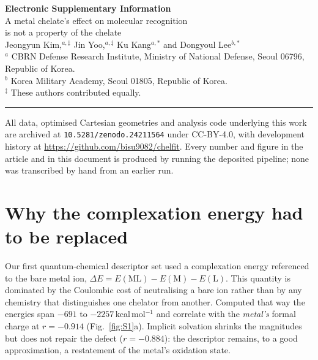 \documentclass[11pt,a4paper]{article}
\begin{document}
\begin{center}
{\Large\bfseries Electronic Supplementary Information}\\[8pt]
{\large A metal chelate's effect on molecular recognition\\is not a property of the chelate}\\[10pt]
{Jeongyun Kim,$^{a,\ddag}$ Jin Yoo,$^{a,\ddag}$ Ku Kang$^{a,\ast}$ and Dongyoul Lee$^{b,\ast}$}\\[6pt]
{\footnotesize $^{a}$ CBRN Defense Research Institute, Ministry of National Defense, Seoul 06796, Republic of Korea.\\
$^{b}$ Korea Military Academy, Seoul 01805, Republic of Korea.\\
$^{\ddag}$ These authors contributed equally.}
\end{center}

\vspace{6pt}
\hrule
\vspace{10pt}

\noindent
All data, optimised Cartesian geometries and analysis code underlying this work are archived at
\mbox{\texttt{10.5281/zenodo.24211564}} under CC-BY-4.0, with development history at
\url{https://github.com/bisu9082/chelfit}. Every number and figure in the article and in this
document is produced by running the deposited pipeline; none was transcribed by hand from an
earlier run.

\tableofcontents

\section{Why the complexation energy had to be replaced}

Our first quantum-chemical descriptor set used a complexation energy referenced to the bare metal
ion, $\Delta E = E(\mathrm{ML}) - E(\mathrm{M}) - E(\mathrm{L})$. This quantity is dominated by the
Coulombic cost of neutralising a bare  ion rather than by any chemistry that
distinguishes one chelator from another. Computed that way the energies span
$-691$ to $-2257$\,kcal\,mol$^{-1}$ and correlate with the \emph{metal's} formal charge at
$r = -0.914$ (Fig.~\ref{fig:S1}a). Implicit solvation shrinks the magnitudes but does not repair
the defect ($r = -0.884$): the descriptor remains, to a good approximation, a restatement of the
metal's oxidation state.
\end{document}
